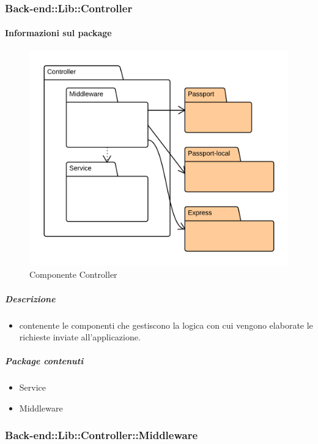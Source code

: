 	\subsubsection{Back-end::Lib::Controller}
	\paragraph{Informazioni sul package} 
		\begin{figure}[H] 
			\begin{center} 
				\includegraphics[width=\textwidth]{uml/package/Back-end::Lib::Controller.png}  
				\caption{Componente Controller}
			\end{center}  
		\end{figure} 
	\subparagraph{Descrizione} 
		\begin{itemize}
		\item[]  contenente le componenti che gestiscono la logica con cui vengono elaborate le richieste inviate all’applicazione.
		\end{itemize} 
		\subparagraph{Package contenuti} 
		\begin{itemize}
				\item Service
				\item Middleware
		\end{itemize}
	\subsubsection{Back-end::Lib::Controller::Middleware}
